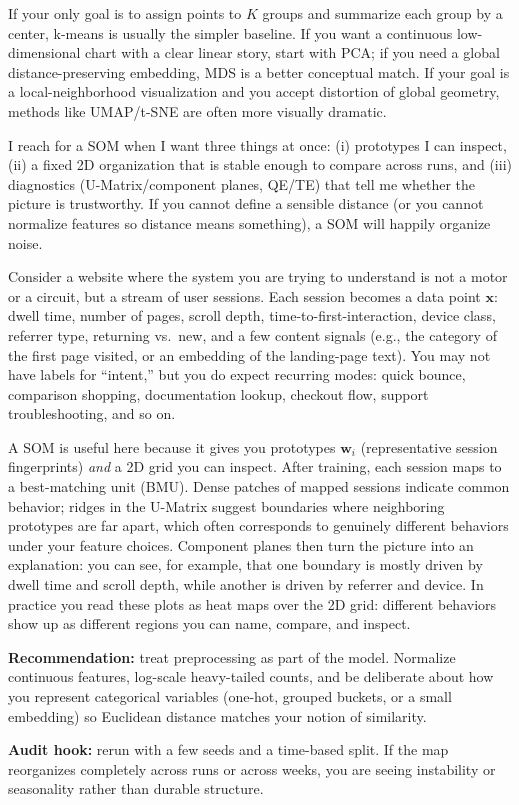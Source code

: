 \begin{tcolorbox}[summarybox, title={Author's note: when a SOM is the wrong tool}]
If your only goal is to assign points to \(K\) groups and summarize each group by a center, k-means is usually the simpler baseline. If you want a continuous low-dimensional chart with a clear linear story, start with PCA; if you need a global distance-preserving embedding, MDS is a better conceptual match. If your goal is a local-neighborhood visualization and you accept distortion of global geometry, methods like UMAP/t-SNE are often more visually dramatic.

I reach for a SOM when I want three things at once: (i) prototypes I can inspect, (ii) a fixed 2D organization that is stable enough to compare across runs, and (iii) diagnostics (U-Matrix/component planes, QE/TE) that tell me whether the picture is trustworthy. If you cannot define a sensible distance (or you cannot normalize features so distance means something), a SOM will happily organize noise.
\end{tcolorbox}

\begin{tcolorbox}[summarybox, title={Application example: website sessions as behavioral modes}]
Consider a website where the system you are trying to understand is not a motor or a circuit, but a stream of user sessions. Each session becomes a data point \(\mathbf{x}\): dwell time, number of pages, scroll depth, time-to-first-interaction, device class, referrer type, returning vs.\ new, and a few content signals (e.g., the category of the first page visited, or an embedding of the landing-page text). You may not have labels for ``intent,'' but you do expect recurring modes: quick bounce, comparison shopping, documentation lookup, checkout flow, support troubleshooting, and so on.

A SOM is useful here because it gives you prototypes \(\mathbf{w}_i\) (representative session fingerprints) \emph{and} a 2D grid you can inspect. After training, each session maps to a best-matching unit (BMU). Dense patches of mapped sessions indicate common behavior; ridges in the U-Matrix suggest boundaries where neighboring prototypes are far apart, which often corresponds to genuinely different behaviors under your feature choices. Component planes then turn the picture into an explanation: you can see, for example, that one boundary is mostly driven by dwell time and scroll depth, while another is driven by referrer and device. In practice you read these plots as heat maps over the 2D grid: different behaviors show up as different regions you can name, compare, and inspect.

\textbf{Recommendation:} treat preprocessing as part of the model. Normalize continuous features, log-scale heavy-tailed counts, and be deliberate about how you represent categorical variables (one-hot, grouped buckets, or a small embedding) so Euclidean distance matches your notion of similarity.

\textbf{Audit hook:} rerun with a few seeds and a time-based split. If the map reorganizes completely across runs or across weeks, you are seeing instability or seasonality rather than durable structure.
\end{tcolorbox}

